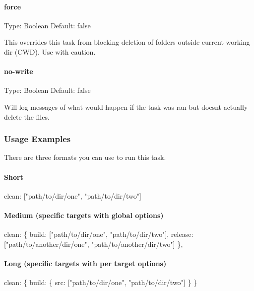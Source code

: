\paragraph*{force}

Type\+: {\ttfamily Boolean} Default\+: {\ttfamily false}

This overrides this task from blocking deletion of folders outside current working dir (C\+WD). Use with caution.

\paragraph*{no-\/write}

Type\+: {\ttfamily Boolean} Default\+: {\ttfamily false}

Will log messages of what would happen if the task was ran but doesn\textquotesingle{}t actually delete the files.

\subsubsection*{Usage Examples}

There are three formats you can use to run this task.

\paragraph*{Short}


\begin{DoxyCode}
clean: ["path/to/dir/one", "path/to/dir/two"]
\end{DoxyCode}


\paragraph*{Medium (specific targets with global options)}


\begin{DoxyCode}
clean: \{
  build: ["path/to/dir/one", "path/to/dir/two"],
  release: ["path/to/another/dir/one", "path/to/another/dir/two"]
\},
\end{DoxyCode}


\paragraph*{Long (specific targets with per target options)}


\begin{DoxyCode}
clean: \{
  build: \{
    src: ["path/to/dir/one", "path/to/dir/two"]
  \}
\}
\end{DoxyCode}


